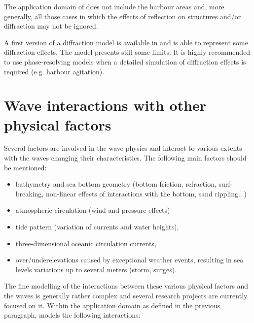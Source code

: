  The application domain of \tomawac does not include the harbour areas and, more generally, all those cases in which the effects of reflection on structures and/or diffraction may not be ignored.

 A first version of a diffraction model is available in \tomawac and is able to represent some diffraction effects. The model presents still some limits. It is highly recommended to use phase-resolving models when a detailed simulation of diffraction effects is required (e.g. harbour agitation).


\section{ Wave interactions with other physical factors}

 Several factors are involved in the wave physics and interact to various extents with the waves changing their characteristics. The following main factors should be mentioned:

 \begin{itemize}
\item bathymetry and sea bottom geometry (bottom friction, refraction, surf-breaking, non-linear effects of interactions with the bottom, sand rippling...)

 \item atmospheric circulation (wind and pressure effects)

 \item tide pattern (variation of currents and water heights),

 \item three-dimensional oceanic circulation currents,

 \item over/underelevations caused by exceptional weather events, resulting in sea levels variations up to several meters (storm, surges).
\end{itemize}

 The fine modelling of the interactions between these various physical factors and the waves is generally rather complex and several research projects are currently focused on it. Within the application domain as defined in the previous paragraph, \tomawac models the following interactions:


